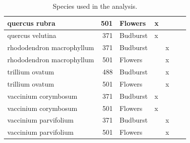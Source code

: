 \documentclass[a4paper,12pt]{article}
\begin{document}
\begin{table}
\begin{tabular}{l|r|l|l|l|l|l}
\hline
quercus rubra & 501 & Flowers & x &  &  & \\
\hline
quercus velutina & 371 & Budburst & x &  &  & \\
\hline
rhododendron macrophyllum & 371 & Budburst &  & x &  & \\
\hline
rhododendron macrophyllum & 501 & Flowers &  & x &  & \\
\hline
trillium ovatum & 488 & Budburst &  & x &  & \\
\hline
trillium ovatum & 501 & Flowers &  & x &  & \\
\hline
vaccinium corymbosum & 371 & Budburst & x &  &  & \\
\hline
vaccinium corymbosum & 501 & Flowers & x &  &  & \\
\hline
vaccinium parvifolium & 371 & Budburst &  & x &  & \\
\hline
vaccinium parvifolium & 501 & Flowers &  & x &  & \\
\hline
\end{tabular}
\caption{Species used in the analysis.}
\end{table}
\end{document}
